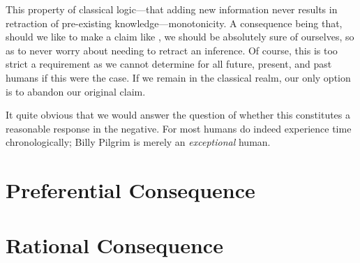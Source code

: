 This property of classical logic---that adding new information never results in retraction of pre-existing knowledge---monotonicity. A consequence being that, should we like to make a claim like , we should be absolutely sure of ourselves, so as to never worry about needing to retract an inference. Of course, this is too strict a requirement as we cannot determine for all future, present, and past humans if this were the case. If we remain in the classical realm, our only option is to abandon our original claim. 

It quite obvious that we would answer the question of whether this constitutes a reasonable response in the negative. For most humans do indeed experience time chronologically; Billy Pilgrim is merely an \textit{exceptional} human.

\section{Preferential Consequence}


\section{Rational Consequence}

